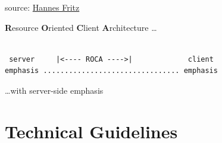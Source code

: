 \documentclass{beamer}
\begin{document}
{
  \begin{frame}
    \vspace*{6.7cm}
    \tiny source: \href{http://www.flickr.com/photos/sensorsicht/5338348801/}{Hannes Fritz}

  \end{frame}
}


\begin{frame}[fragile]{\insertsectionhead}
  \textbf{R}esource \textbf{O}riented \textbf{C}lient \textbf{A}rchitecture \dots

  \begin{verbatim}

 server     |<---- ROCA ---->|             client
emphasis ................................ emphasis
  \end{verbatim}

  \dots with server-side emphasis

\end{frame}

\section{Technical Guidelines}
\end{document}
